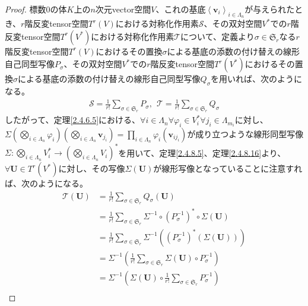 \documentclass[dvipdfmx]{jsarticle}
\begin{document}
\begin{proof}
標数$0$の体$K$上の$n$次元vector空間$V$、これの基底$\left\langle \mathbf{v}_{i} \right\rangle_{i \in \varLambda_{n}}$が与えられたとき、$r$階反変tensor空間$T^{r}(V)$における対称化作用素$\mathcal{S}$、その双対空間$V^{*}$での$r$階反変tensor空間$T^{r}(V^{*})$における対称化作用素$\mathcal{T}$について、定義より$\sigma \in \mathfrak{S}_{r}$なる$r$階反変tensor空間$T^{r}(V)$におけるその置換$\sigma$による基底の添数の付け替えの線形自己同型写像$P_{\sigma}$、その双対空間$V^{*}$での$r$階反変tensor空間$T^{r}(V^{*})$におけるその置換$\sigma$による基底の添数の付け替えの線形自己同型写像$Q_{\sigma}$を用いれば、次のようになる。
\begin{align*}
\mathcal{S}=\frac{1}{r!}\sum_{\sigma \in \mathfrak{S}_{r}} P_{\sigma},\ \ \mathcal{T}=\frac{1}{r!}\sum_{\sigma \in \mathfrak{S}_{r}} Q_{\sigma}
\end{align*}
したがって、定理\ref{2.4.6.5}における、$\forall i \in \varLambda_{n}\forall\varphi_{i} \in V_{i}^{*}\forall j_{i} \in \varLambda_{m_{i}}$に対し、$\varSigma\left( \bigotimes_{i \in \varLambda_{n}} \varphi_{i} \right)\left( \bigotimes_{i \in \varLambda_{n}} \mathbf{v}_{j_{i}} \right) = \prod_{i \in \varLambda_{n}} {\varphi_{i}\left( \mathbf{v}_{ij_{i}} \right)}$が成り立つような線形同型写像$\varSigma:\bigotimes_{i \in \varLambda_{n}} V_{i}^{*} \rightarrow \left( \bigotimes_{i \in \varLambda_{n}} V_{i} \right)^{*}$を用いて、定理\ref{2.4.8.5}、定理\ref{2.4.8.16}より、$\forall\mathbf{U} \in T^{r}\left( V^{*} \right)$に対し、その写像$\varSigma\left( \mathbf{U} \right)$が線形写像となっていることに注意すれば、次のようになる。
\begin{align*}
\mathcal{T}\left( \mathbf{U} \right) &= \frac{1}{r!}\sum_{\sigma \in \mathfrak{S}_{r}} Q_{\sigma}\left( \mathbf{U} \right)\\
&= \frac{1}{r!}\sum_{\sigma \in \mathfrak{S}_{r}} {\varSigma^{- 1} \circ \left( P_{\sigma}^{- 1} \right)^{*} \circ \varSigma\left( \mathbf{U} \right)}\\
&= \frac{1}{r!}\sum_{\sigma \in \mathfrak{S}_{r}} {\varSigma^{- 1}\left( \left( P_{\sigma}^{- 1} \right)^{*}\left( \varSigma\left( \mathbf{U} \right) \right) \right)}\\
&= \varSigma^{- 1}\left( \frac{1}{r!}\sum_{\sigma \in \mathfrak{S}_{r}} {\varSigma\left( \mathbf{U} \right) \circ P_{\sigma}^{- 1}} \right)\\
&= \varSigma^{- 1}\left( \varSigma\left( \mathbf{U} \right) \circ \frac{1}{r!}\sum_{\sigma \in \mathfrak{S}_{r}} P_{\sigma}^{- 1} \right)\\

\end{align*}
\end{proof}
\end{document}
